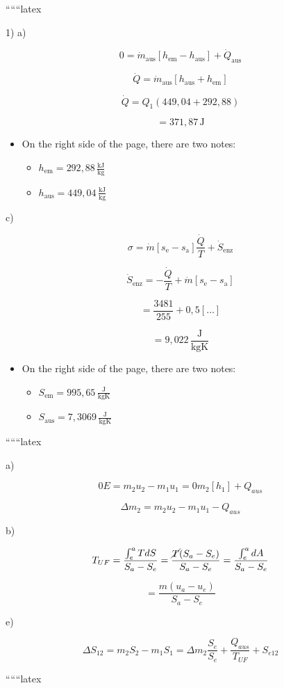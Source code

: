 
``````latex

1) a)

\[
0 = \dot{m}_{\text{aus}} \left[ h_{\text{em}} - h_{\text{aus}} \right] + \dot{Q}_{\text{aus}}
\]

\[
\dot{Q} = \dot{m}_{\text{aus}} \left[ h_{\text{aus}} + h_{\text{em}} \right]
\]

\[
\dot{Q} = Q_{\text{1}} \left( 449,04 + 292,88 \right)
\]

\[
= 371,87 \, \text{J}
\]

\begin{itemize}
    \item On the right side of the page, there are two notes:
    \begin{itemize}
        \item $h_{\text{em}} = 292,88 \, \frac{\text{kJ}}{\text{kg}}$
        \item $h_{\text{aus}} = 449,04 \, \frac{\text{kJ}}{\text{kg}}$
    \end{itemize}
\end{itemize}

c)

\[
\sigma = \dot{m} \left[ s_{\text{e}} - s_{\text{a}} \right] \frac{\dot{Q}}{T} + \dot{S}_{\text{enz}}
\]

\[
\dot{S}_{\text{enz}} = - \frac{\dot{Q}}{T} + \dot{m} \left[ s_{\text{e}} - s_{\text{a}} \right]
\]

\[
= \frac{3481}{255} + 0,5 \left[ \ldots \right]
\]

\[
= 9,022 \, \frac{\text{J}}{\text{kgK}}
\]

\begin{itemize}
    \item On the right side of the page, there are two notes:
    \begin{itemize}
        \item $S_{\text{em}} = 995,65 \, \frac{\text{J}}{\text{kgK}}$
        \item $S_{\text{aus}} = 7,3069 \, \frac{\text{J}}{\text{kgK}}$
    \end{itemize}
\end{itemize}

``````latex

a)

\[
0E = m_2 u_2 - m_1 u_1 = 0 m_2 \left[ h_1 \right] + Q_{aus}
\]

\[
\Delta m_2 = m_2 u_2 - m_1 u_1 - Q_{aus}
\]

b)

\[
T_{UF} = \frac{\int_{e}^{a} T dS}{S_a - S_e} = \frac{\cancel{T} (S_a - S_e)}{S_a - S_e} = \frac{\int_{e}^{a} dA}{S_a - S_e}
\]

\[
= \frac{m (u_a - u_e)}{S_a - S_e}
\]

e)

\[
\Delta S_{12} = m_2 S_2 - m_1 S_1 = \Delta m_2 \frac{S_e}{S_e} + \frac{Q_{aus}}{T_{UF}} + S_{e12}
\]

``````latex


